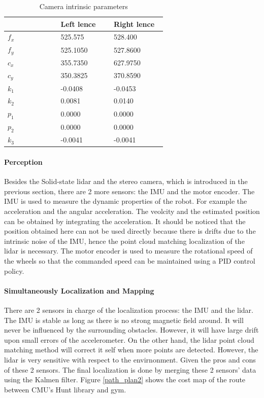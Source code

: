 \documentclass[balance,upint,subscriptcorrection,varvw,nofoot, mathalfa=cal=boondoxo,spanish,french,vietnamese,russian,greek,pdf-a,fontspec,colorlinks]{asmeconf}
\begin{document}
\begin{table}[!ht]
    \centering
    \begin{tabular}{p{0.3\linewidth} p{0.3\linewidth} p{0.3\linewidth}}
    \hline

	~ & Left lence & Right lence \\ \hline
	$f_x$ & 525.575 & 528.400 \\ 
	$f_y$ & 525.1050 & 527.8600 \\ 
	$c_x$ & 355.7350 & 627.9750 \\ 
	$c_y$ & 350.3825 & 370.8590 \\ 
	$k_1$ & -0.0408 & -0.0453 \\ 
	$k_2$ & 0.0081 & 0.0140 \\ 
	$p_1$ & 0.0000 & 0.0000 \\ 
	$p_2$ & 0.0000 & 0.0000 \\ 
	$k_3$ & -0.0041 & -0.0041 \\ \hline
    \end{tabular}
	\caption{Camera intrinsic parameters}\label{calib}
\end{table}

\paragraph{Perception} Besides the Solid-state lidar and the stereo camera, which is introduced in the previous section, there are 2 more sensors: the IMU and the motor encoder. The IMU is used to measure the dynamic properties of the robot. For example the acceleration and the angular acceleration. The veolcity and the estimated position can be obtained by integrating the acceleration. It should be noticed that the position obtained here can not be used directly because there is drifts due to the intrinsic noise of the IMU, hence the point cloud matching localization of the lidar is necessary. The motor encoder is used to measure the rotational speed of the wheels so that the commanded speed can be maintained using a PID control policy.
\paragraph{Simultaneously Localization and Mapping} There are 2 sensors in charge of the localization process: the IMU and the lidar. The IMU is stable as long as there is no strong magnetic field around. It will never be influenced by the surrounding obstacles. However, it will have large drift upon small errors of the accelerometer. On the other hand, the lidar point cloud matching method will correct it self when more points are detected. However, the lidar is very sensitive with respect to the envirnonment. Given the pros and cons of these 2 sensors. The final localization is done by merging these 2 sensors' data using the Kalmen filter.
Figure \ref{path_plan2} shows the cost map of the route between CMU's Hunt library and gym.  
\end{document}
